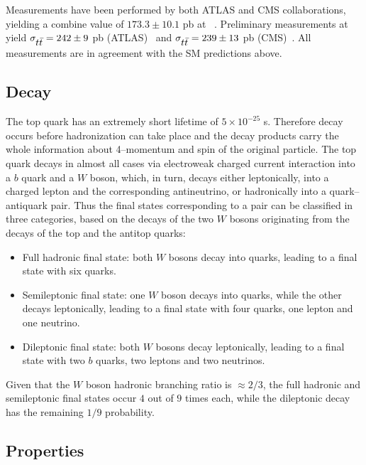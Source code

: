 Measurements have been performed by both ATLAS and CMS
collaborations, yielding a combine value of $173.3\pm10.1$ pb at
\seventev{}~\cite{ATLAS-CONF-2012-134,CMS-PAS-TOP-12-003}. Preliminary
measurements at \eighttev{} yield $\sigma_{\mbox{$t\bar{t}$}{}}=242\pm{}9$ pb
(ATLAS)~\cite{Aad:2014kva} and $\sigma_{\mbox{$t\bar{t}$}{}}=239\pm{}13$ pb
(CMS)~\cite{Chatrchyan:2013faa}. All measurements are in agreement
with the SM predictions above.

\subsection{Decay}
\label{sec:topdecay}

The top quark has an extremely short lifetime of $5\times{}10^{-25}$
s. Therefore decay occurs before hadronization can take place and the
decay products carry the whole information about \mbox{4--momentum} and spin
of the original particle.
The top quark decays in almost all cases via electroweak
charged current interaction into a $b$ quark and a $W$ boson, which,
in turn, decays either leptonically, into a charged lepton and the corresponding
antineutrino, or hadronically into a quark--antiquark pair. Thus the
final states corresponding to a \ttbar{} pair can be classified in
three categories, based on the decays of the two $W$ bosons
originating from the decays of the top and the antitop quarks:
\begin{itemize}
\item Full hadronic final state: both $W$ bosons decay into quarks,
  leading to a \ttbar{} final state with six quarks.
\item Semileptonic final state: one $W$ boson decays into quarks,
  while the other decays leptonically, leading to a final state with
  four quarks, one lepton and one neutrino.
\item Dileptonic final state: both $W$ bosons decay leptonically,
  leading to a final state with two $b$ quarks, two leptons and two
  neutrinos. 
\end{itemize}
Given that the $W$ boson hadronic branching ratio is
$\approx{}2/3$, the full hadronic and semileptonic final states occur
$4$ out of $9$ times each, while the dileptonic decay has the
remaining $1/9$ probability.  

\subsection{Properties}
\label{sec:topprop}

